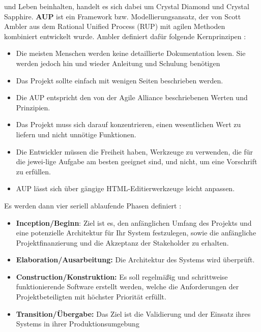 und Leben beinhalten, handelt es sich dabei um Crystal Diamond und Crystal Sapphire.\cite{cockburn2004,Ibrahim2020-ip}
\newline
\textbf{AUP} ist ein Framework bzw. Modellierungsansatz, der von Scott Ambler aus dem Rational Unified Process (RUP) mit agilen Methoden kombiniert entwickelt wurde. 
Ambler definiert dafür folgende Kernprinzipen \cite{Christou2010-vf}:
\begin{itemize}
    \item Die meisten Menschen werden keine detaillierte Dokumentation lesen.  Sie werden jedoch hin und wieder Anleitung und Schulung benötigen
    \item Das Projekt sollte einfach mit wenigen Seiten beschrieben werden.
    \item Die AUP entspricht den von der Agile Alliance beschriebenen Werten und Prinzipien.    
    \item Das Projekt muss sich darauf konzentrieren, einen wesentlichen Wert zu liefern und nicht unnötige Funktionen.
    \item Die Entwickler müssen die Freiheit haben, Werkzeuge zu verwenden, die für die jewei-lige Aufgabe am besten geeignet sind, und nicht, um eine Vorschrift zu erfüllen.
    \item AUP lässt sich über gängige HTML-Editierwerkzeuge leicht anpassen. 
\end{itemize}
Es werden dann vier seriell ablaufende Phasen definiert \cite{Li2010-ge,ShuiYuan2009-or}:
\begin{itemize}
    \item \textbf{Inception/Beginn}: Ziel ist es, den anfänglichen Umfang des Projekts und eine potenzielle Architektur für Ihr System festzulegen, sowie die anfängliche Projektfinanzierung und die Akzeptanz der Stakeholder zu erhalten.
    \item \textbf{Elaboration/Ausarbeitung:} Die Architektur des Systems wird überprüft.
    \item \textbf{Construction/Konstruktion: }Es soll regelmäßig und schrittweise funktionierende Software erstellt werden, welche die Anforderungen der Projektbeteiligten mit höchster Priorität erfüllt.
    \item \textbf{Transition/Übergabe:} Das Ziel ist die Validierung und der Einsatz ihres Systems in ihrer Produktionsumgebung
\end{itemize}

